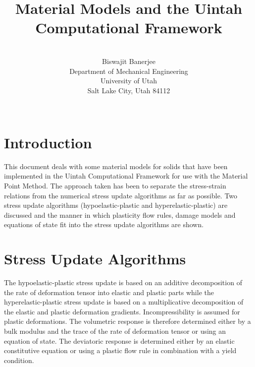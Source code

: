 \documentclass[10pt]{article}
\title{Material Models and the Uintah Computational Framework}
\author{
\\
Biswajit Banerjee \\
Department of Mechanical Engineering \\
University of Utah \\
Salt Lake City, Utah 84112 \\
\\
}
\date{}
\begin{document}
  \maketitle
  \tableofcontents

  \section{Introduction}
  This document deals with some material models for solids that
  have been implemented in the Uintah Computational Framework 
  for use with the Material Point Method.  The approach taken
  has been to separate the stress-strain relations from the 
  numerical stress update algorithms as far as possible.  Two
  stress update algorithms (hypoelastic-plastic and 
  hyperelastic-plastic) are discussed and the manner in which 
  plasticity flow rules, damage models and equations of state
  fit into the stress update algorithms are shown.
  
  \section{Stress Update Algorithms}
  The hypoelastic-plastic stress update is based on an additive
  decomposition of the rate of deformation tensor into elastic
  and plastic parts while the hyperelastic-plastic stress update
  is based on a multiplicative decomposition of the elastic and 
  plastic deformation gradients.  Incompressibility is assumed
  for plastic deformations.  The volumetric response is therefore
  determined either by a bulk modulus and the trace of the rate
  of deformation tensor or using an equation of state.  The 
  deviatoric response is determined either by an elastic constitutive 
  equation or using a plastic flow rule in combination with a 
  yield condition. 
  
\end{document}
